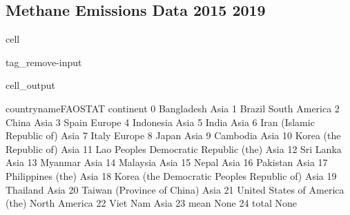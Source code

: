 \documentclass[letterpaper,10pt,english]{jupyterBook}
\begin{document}
\subsection{Methane Emissions Data 2015 \sphinxhyphen{} 2019}
\label{\detokenize{notebooks/hidden_post:methane-emissions-data-2015-2019}}
\begin{sphinxuseclass}{cell}
\begin{sphinxuseclass}{tag_remove-input}\begin{sphinxVerbatimOutput}

\begin{sphinxuseclass}{cell_output}
\begin{sphinxVerbatim}[commandchars=\\\{\}]
                           country\PYGZus{}name\PYGZus{}FAOSTAT      continent  \PYGZbs{}
0                                    Bangladesh           Asia   
1                                        Brazil  South America   
2                                         China           Asia   
3                                         Spain         Europe   
4                                     Indonesia           Asia   
5                                         India           Asia   
6                    Iran (Islamic Republic of)           Asia   
7                                         Italy         Europe   
8                                         Japan           Asia   
9                                      Cambodia           Asia   
10                      Korea (the Republic of)           Asia   
11       Lao People\PYGZsq{}s Democratic Republic (the)           Asia   
12                                    Sri Lanka           Asia   
13                                      Myanmar           Asia   
14                                     Malaysia           Asia   
15                                        Nepal           Asia   
16                                     Pakistan           Asia   
17                            Philippines (the)           Asia   
18  Korea (the Democratic People\PYGZsq{}s Republic of)           Asia   
19                                     Thailand           Asia   
20                   Taiwan (Province of China)           Asia   
21               United States of America (the)  North America   
22                                     Viet Nam           Asia   
23                                         mean           None   
24                                        total           None   


\end{sphinxVerbatim}
\end{sphinxuseclass}
\end{sphinxVerbatimOutput}
\end{sphinxuseclass}
\end{sphinxuseclass}
\end{document}
